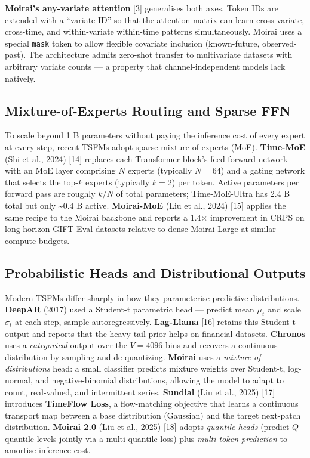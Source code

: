 \textbf{Moirai's any-variate attention} {[}3{]} generalises both axes. Token IDs are extended with a ``variate ID'' so that the attention matrix can learn cross-variate, cross-time, and within-variate within-time patterns simultaneously. Moirai uses a special \texttt{mask} token to allow flexible covariate inclusion (known-future, observed-past). The architecture admits zero-shot transfer to multivariate datasets with arbitrary variate counts --- a property that channel-independent models lack natively.

\subsection{Mixture-of-Experts Routing and Sparse FFN}\label{mixture-of-experts-routing-and-sparse-ffn}

To scale beyond 1 B parameters without paying the inference cost of every expert at every step, recent TSFMs adopt sparse mixture-of-experts (MoE). \textbf{Time-MoE} (Shi et al., 2024) {[}14{]} replaces each Transformer block's feed-forward network with an MoE layer comprising \(N\) experts (typically \(N=64\)) and a gating network that selects the top-\(k\) experts (typically \(k=2\)) per token. Active parameters per forward pass are roughly \(k/N\) of total parameters; Time-MoE-Ultra has 2.4 B total but only \textasciitilde0.4 B active. \textbf{Moirai-MoE} (Liu et al., 2024) {[}15{]} applies the same recipe to the Moirai backbone and reports a 1.4× improvement in CRPS on long-horizon GIFT-Eval datasets relative to dense Moirai-Large at similar compute budgets.

\subsection{Probabilistic Heads and Distributional Outputs}\label{probabilistic-heads-and-distributional-outputs}

Modern TSFMs differ sharply in how they parameterise predictive distributions. \textbf{DeepAR} (2017) used a Student-t parametric head --- predict mean \(\mu_t\) and scale \(\sigma_t\) at each step, sample autoregressively. \textbf{Lag-Llama} {[}16{]} retains this Student-t output and reports that the heavy-tail prior helps on financial datasets. \textbf{Chronos} uses a \emph{categorical} output over the \(V=4096\) bins and recovers a continuous distribution by sampling and de-quantizing. \textbf{Moirai} uses a \emph{mixture-of-distributions} head: a small classifier predicts mixture weights over Student-t, log-normal, and negative-binomial distributions, allowing the model to adapt to count, real-valued, and intermittent series. \textbf{Sundial} (Liu et al., 2025) {[}17{]} introduces \textbf{TimeFlow Loss}, a flow-matching objective that learns a continuous transport map between a base distribution (Gaussian) and the target next-patch distribution. \textbf{Moirai 2.0} (Liu et al., 2025) {[}18{]} adopts \emph{quantile heads} (predict \(Q\) quantile levels jointly via a multi-quantile loss) plus \emph{multi-token prediction} to amortise inference cost.

